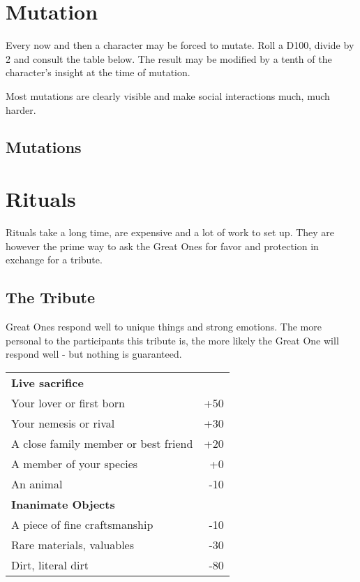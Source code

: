 \documentclass[12pt,a4paper,openany]{book}
\begin{document}
	\chapter{Mutation}
	\label{ch:mutation}
	Every now and then a character may be forced to mutate.
	Roll a D100, divide by 2 and consult the table below.
	The result may be modified by a tenth of the character's insight at the time of mutation.
	\begin{exampleblock}
		Most mutations are clearly visible and make social interactions much, much harder.
	\end{exampleblock}
	\begin{multicols}{2}
		\begin{enumerate}
			\setlength\itemsep{-10mm}
		\end{enumerate}
	\end{multicols}
	
	\section*{Mutations}
	\vspace{4mm}
	\begin{multicols}{2}
	\end{multicols}
	
	\chapter{Rituals}
	\label{ch:rituals}
	Rituals take a long time, are expensive and a lot of work to set up. They are however the prime way to ask the Great Ones for favor and protection in exchange for a tribute.
	\section{The Tribute}
	Great Ones respond well to unique things and strong emotions. The more personal to the participants this tribute is, the more likely the Great One will respond well - but nothing is guaranteed.
	\par
	\begin{center}
	\begin{tabular}{lr}
		\textbf{Live sacrifice} & \\
		Your lover or first born & +50 \\
		Your nemesis or rival & +30 \\
		A close family member or best friend & +20 \\
		A member of your species & +0 \\
		An animal & -10 \\
		\hline
		\textbf{Inanimate Objects} & \\
		A piece of fine craftsmanship & -10 \\
		Rare materials, valuables & -30 \\
		Dirt, literal dirt & -80
	\end{tabular}
	\end{center}
\end{document}
